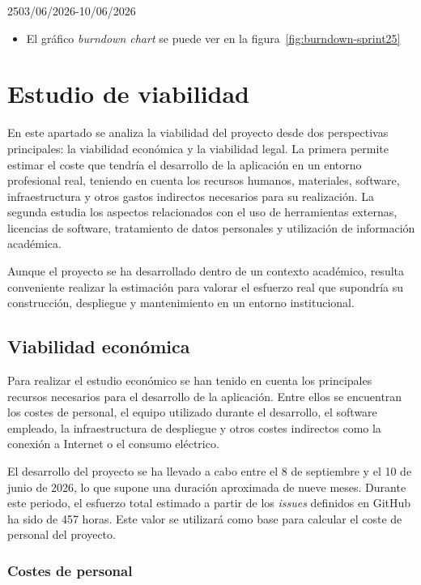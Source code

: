 \begin{Sprint}{25}{03/06/2026-10/06/2026}
\begin{itemize}
		\item{}
		El gráfico \textit{burndown chart} se puede ver en la figura~\ref{fig:burndown-sprint25}
	\end{itemize}
\end{Sprint}

\section{Estudio de viabilidad}

En este apartado se analiza la viabilidad del proyecto desde dos perspectivas principales: la viabilidad económica y la viabilidad legal. La primera permite estimar el coste que tendría el desarrollo de la aplicación en un entorno profesional real, teniendo en cuenta los recursos humanos, materiales, software, infraestructura y otros gastos indirectos necesarios para su realización. La segunda estudia los aspectos relacionados con el uso de herramientas externas, licencias de software, tratamiento de datos personales y utilización de información académica.

Aunque el proyecto se ha desarrollado dentro de un contexto académico, resulta conveniente realizar la estimación para valorar el esfuerzo real que supondría su construcción, despliegue y mantenimiento en un entorno institucional.

\subsection{Viabilidad económica}

Para realizar el estudio económico se han tenido en cuenta los principales recursos necesarios para el desarrollo de la aplicación. Entre ellos se encuentran los costes de personal, el equipo utilizado durante el desarrollo, el software empleado, la infraestructura de despliegue y otros costes indirectos como la conexión a Internet o el consumo eléctrico.

El desarrollo del proyecto se ha llevado a cabo entre el 8 de septiembre y el 10 de junio de 2026, lo que supone una duración aproximada de nueve meses. Durante este periodo, el esfuerzo total estimado a partir de los \textit{issues} definidos en GitHub ha sido de 457 horas. Este valor se utilizará como base para calcular el coste de personal del proyecto.

\subsubsection{Costes de personal}

